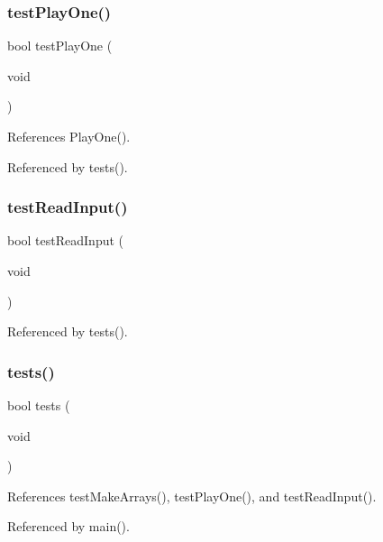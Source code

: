 \subsubsection{test\+Play\+One()}
{\footnotesize\ttfamily bool test\+Play\+One (\begin{DoxyParamCaption}\item[{void}]{ }\end{DoxyParamCaption})}



References Play\+One().



Referenced by tests().

\mbox{\label{tests_8c_aa89f64db87aebe77bd891e2894595e4e}} 
\subsubsection{test\+Read\+Input()}
{\footnotesize\ttfamily bool test\+Read\+Input (\begin{DoxyParamCaption}\item[{void}]{ }\end{DoxyParamCaption})}



Referenced by tests().

\mbox{\label{tests_8c_a5e6e6e78df62797046c9ea173550a68a}} 
\subsubsection{tests()}
{\footnotesize\ttfamily bool tests (\begin{DoxyParamCaption}\item[{void}]{ }\end{DoxyParamCaption})}



References test\+Make\+Arrays(), test\+Play\+One(), and test\+Read\+Input().



Referenced by main().

